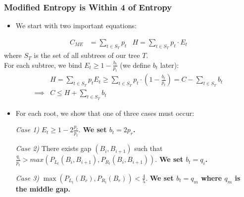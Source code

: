 \documentclass[]{beamer}
\theoremstyle{plain}
\begin{document}
\begin{frame} \frametitle{Modified Entropy is Within 4 of Entropy}

\begin{itemize}
\item We start with two important equations:
\end{itemize}
\begin{align*}
C_{ME} &= \sum_{t \in S_T} p_t
 &H = \sum_{t \in S_T} p_t \cdot E_t
\end{align*}  
where $S_T$ is the set of all subtrees of our tree $T$. \\

\noindent For each subtree, we bind $E_t \geq 1 - \frac{b_t}{p_t}$ (we define $b_t$ later): 
\begin{align*}
&H = \sum_{t \in S_T} p_t E_t \geq \sum_{t \in S_T} p_t \cdot (1 - \frac{b_t}{p_t}) = C - \sum_{t \in S_T} b_t \\
 \implies &C \leq H + \sum_{t \in S_T} b_t
\end{align*}

\end{frame}

\begin{frame}

\begin{itemize}
\item For each root, we show that one of three cases must occur:

\item[\textit{Case 1)}] $E_t \geq 1-2 \frac{p_r}{p_t}$. \textbf{We set $b_t = 2p_r$.}

\item[\textit{Case 2)}] There exists gap $(B_i, B_{i+1})$ such that $\frac{q_i}{p_t} > max(P_{L_t}(B_i, B_{i+1}), P_{R_t}(B_i, B_{i+1}))$. \textbf{We set $b_t = q_i$.}

\item[\textit{Case 3)}]  $\max(P_{L_t}(B_r), P_{R_t}(B_r)) < \frac{4}{5}$. \textbf{We set $b_t = q_m$ where $q_m$ is the middle gap.}

\end{itemize}


\end{frame}
\end{document}
